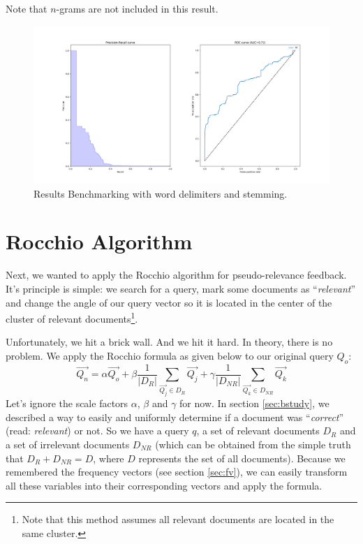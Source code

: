 \documentclass[11pt]{article}
\begin{document}
Note that $n$-grams are not included in this result.

 \begin{figure}[h!]
     \centering
     \includegraphics[width=\textwidth]{images/customAna-stem}
     \caption{Results Benchmarking with word delimiters and stemming.}
     \label{fig:final}
 \end{figure}

\section{Rocchio Algorithm}\label{sec:rocchio}
Next, we wanted to apply the \textsf{Rocchio} algorithm for pseudo-relevance feedback. It's principle is simple: we search for a query, mark some documents as ``\textit{relevant}'' and change the angle of our query vector so it is located in the center of the cluster of relevant documents\footnote{Note that this method assumes all relevant documents are located in the same cluster.}.

Unfortunately, we hit a brick wall. And we hit it hard. In theory, there is no problem. We apply the Rocchio formula as given below to our original query $Q_o$:
$$\overrightarrow{Q_n} = \alpha \overrightarrow{Q_o} + \beta \frac{1}{|D_R|} \sum_{\overrightarrow{Q_j} \in D_R}{\overrightarrow{Q_j}} + \gamma \frac{1}{|D_{NR}|} \sum_{\overrightarrow{Q_k} \in D_{NR}}{\overrightarrow{Q_k}}$$
Let's ignore the scale factors $\alpha$, $\beta$ and $\gamma$ for now. In section \ref{sec:bstudy}, we described a way to easily and uniformly determine if a document was ``\textit{correct}'' (read: \textit{relevant}) or not. So we have a query $q$, a set of relevant documents $D_R$ and a set of irrelevant documents $D_{NR}$ (which can be obtained from the simple truth that $D_R + D_{NR} = D$, where $D$ represents the set of all documents). Because we remembered the frequency vectors (see section \ref{sec:fv}), we can easily transform all these variables into their corresponding vectors and apply the formula.
\end{document}
